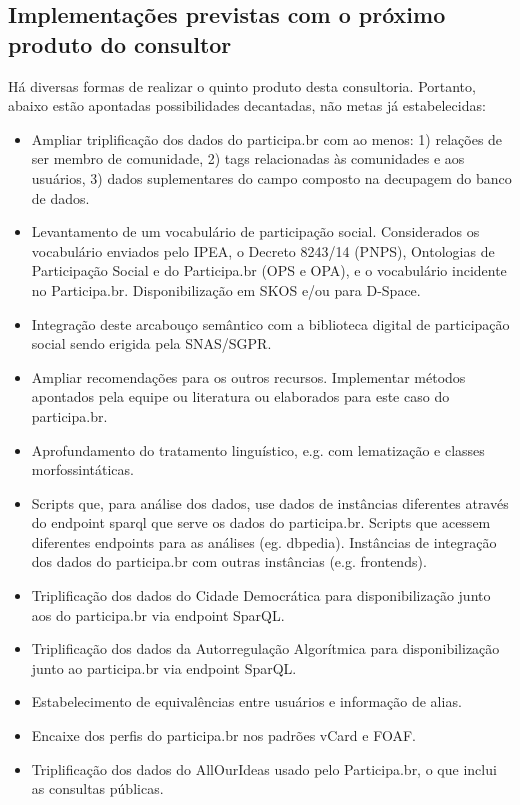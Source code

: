 \documentclass[12pt]{article}
\begin{document}
\subsection{Implementações previstas com o próximo produto do consultor}
Há diversas formas de realizar o quinto produto desta consultoria. Portanto, abaixo estão apontadas possibilidades decantadas, não metas já estabelecidas:
\begin{itemize}
    \item Ampliar triplificação dos dados do participa.br com ao menos: 1) relações de ser membro de comunidade, 2) tags relacionadas às comunidades e aos usuários, 3) dados suplementares do campo composto na decupagem do banco de dados.
    \item Levantamento de um vocabulário de participação social. Considerados os vocabulário enviados pelo IPEA, o Decreto 8243/14 (PNPS), Ontologias de Participação Social e do Participa.br (OPS e OPA), e o vocabulário incidente no Participa.br. Disponibilização em SKOS e/ou para D-Space.
    \item Integração deste arcabouço semântico com a biblioteca digital de participação social sendo erigida pela SNAS/SGPR.
    \item Ampliar recomendações para os outros recursos. Implementar métodos apontados pela equipe ou literatura ou elaborados para este caso do participa.br.
    \item Aprofundamento do tratamento linguístico, e.g. com lematização e classes morfossintáticas.
    \item Scripts que, para análise dos dados, use dados de instâncias diferentes através do endpoint sparql que serve os dados do participa.br. Scripts que acessem diferentes endpoints para as análises (eg. dbpedia). Instâncias de integração dos dados do participa.br com outras instâncias (e.g. frontends).
    \item Triplificação dos dados do Cidade Democrática para disponibilização junto aos do participa.br via endpoint SparQL.
    \item Triplificação dos dados da Autorregulação Algorítmica para disponibilização junto ao participa.br via endpoint SparQL.
    \item Estabelecimento de equivalências entre usuários e informação de alias.
    \item Encaixe dos perfis do participa.br nos padrões vCard e FOAF.
    \item Triplificação dos dados do AllOurIdeas usado pelo Participa.br, o que inclui as consultas públicas.

\end{itemize}
\end{document}
